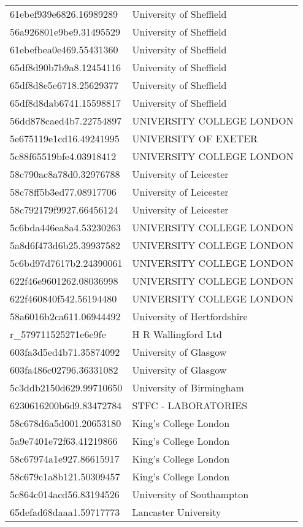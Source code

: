 \begin{tabular}{ll}
61ebef939e6826.16989289 & University of Sheffield \\
56a926801e9be9.31495529 & University of Sheffield \\
61ebefbea0e469.55431360 & University of Sheffield \\
65df8d90b7b9a8.12454116 & University of Sheffield \\
65df8d8e5e6718.25629377 & University of Sheffield \\
65df8d8dab6741.15598817 & University of Sheffield \\
56dd878caed4b7.22754897 & UNIVERSITY COLLEGE LONDON \\
5e675119e1cd16.49241995 & UNIVERSITY OF EXETER \\
5c88f65519bfe4.03918412 & UNIVERSITY COLLEGE LONDON \\
58c790ac8a78d0.32976788 & University of Leicester \\
58c78ff5b3ed77.08917706 & University of Leicester \\
58c792179f9927.66456124 & University of Leicester \\
5c6bda446ea8a4.53230263 & UNIVERSITY COLLEGE LONDON \\
5a8d6f473d6b25.39937582 & UNIVERSITY COLLEGE LONDON \\
5c6bd97d7617b2.24390061 & UNIVERSITY COLLEGE LONDON \\
622f46e9601262.08036998 & UNIVERSITY COLLEGE LONDON \\
622f460840f542.56194480 & UNIVERSITY COLLEGE LONDON \\
58a6016b2ca611.06944492 & University of Hertfordshire \\
r_579711525271e6e9fe & H R Wallingford Ltd \\
603fa3d5ed4b71.35874092 & University of Glasgow \\
603fa486c02796.36331082 & University of Glasgow \\
5c3ddb2150d629.99710650 & University of Birmingham \\
6230616200b6d9.83472784 & STFC - LABORATORIES \\
58c678d6a5d001.20653180 & King's College London \\
5a9e7401e72f63.41219866 & King's College London \\
58c67974a1e927.86615917 & King's College London \\
58c679c1a8b121.50309457 & King's College London \\
5c864c014acd56.83194526 & University of Southampton \\
65defad68daaa1.59717773 & Lancaster University \\

\end{tabular}
